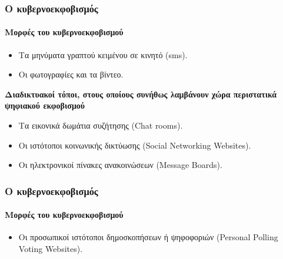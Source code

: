 \documentclass[hyperref={pdfpagelabels=false}, t]{beamer}
\let\olditem=\item%
\renewcommand{\item}{\olditem \justifying}%
\begin{document}
%
%

\begin{frame}[t]
\frametitle{Ο κυβερνοεκφοβισμός}
\vspace{10pt}
\framesubtitle{Μορφές του κυβερνοεκφοβισμού}
\vspace{-18.5pt}
\begin{adjustwidth}{-0.7cm}{}
\justifying
\begin{itemize}
  \item Tα μηνύματα γραπτού κειμένου σε κινητό (sms). \setlength{\itemsep}{15pt}
  \item Oι φωτογραφίες και τα βίντεο.  \setlength{\itemsep}{15pt}   
\end{itemize}
\begin{list}{\quad}{}
\item \textbf{Διαδικτυακοί τόποι, στους οποίους συνήθως λαμβάνουν χώρα περιστατικά
ψηφιακού εκφοβισμού}
\end{list}
\begin{itemize}
  \item Τα εικονικά δωμάτια συζήτησης (Chat rooms). \setlength{\itemsep}{15pt}
  \item Oι ιστότοποι κοινωνικής δικτύωσης (Social Networking Websites).  \setlength{\itemsep}{15pt} 
  \item Oι ηλεκτρονικοί πίνακες ανακοινώσεων (Message Boards).  \setlength{\itemsep}{15pt}  
 \end{itemize}
\end{adjustwidth}
\end{frame}

%
%

\begin{frame}[t]
\frametitle{Ο κυβερνοεκφοβισμός}
\vspace{10pt}
\framesubtitle{Μορφές του κυβερνοεκφοβισμού}
\vspace{-18.5pt}
\begin{adjustwidth}{-0.7cm}{}
\justifying
\begin{itemize}
  \item Oι προσωπικοί ιστότοποι δημοσκοπήσεων ή ψηφοφοριών (Personal Polling Voting Websites).
 \setlength{\itemsep}{15pt}
\end{itemize}

\end{adjustwidth}
\end{frame}

%
%
\end{document}
